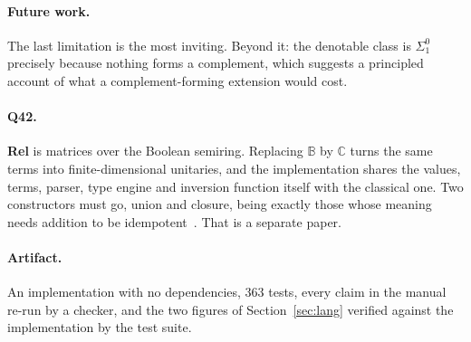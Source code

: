 \documentclass[runningheads,envcountsame]{llncs}
\newcommand{\Rel}{\textbf{Rel}}
\begin{document}
\paragraph{Future work.} The last limitation is the most inviting. Beyond it: the
denotable class is $\Sigma^0_1$ precisely because nothing forms a complement, which
suggests a principled account of what a complement-forming extension would cost.

\paragraph{Q42.} \Rel{} is matrices over the Boolean semiring. Replacing
$\mathbb{B}$ by $\mathbb{C}$ turns the same terms into finite-dimensional
unitaries, and the implementation shares the values, terms, parser, type engine and
inversion function itself with the classical one. Two constructors must go, union
and closure, being exactly those whose meaning needs addition to be
idempotent~\cite{sqrtpi}. That is a separate paper.

\paragraph{Artifact.} An implementation with no dependencies, 363 tests, every
claim in the manual re-run by a checker, and the two figures of
Section~\ref{sec:lang} verified against the implementation by the test suite.



\end{document}
